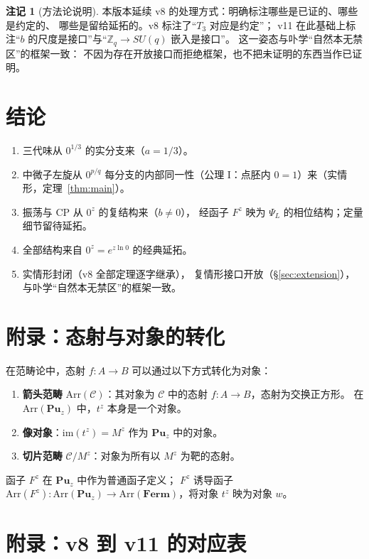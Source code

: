 \documentclass[11pt]{ctexart}
\theoremstyle{plain}
\theoremstyle{definition}
\newtheorem{rem}[thm]{注记}
\newcommand{\Cat}{\mathbf}
\begin{document}
\begin{rem}[方法论说明]\label{rem:method}
本版本延续 v8 的处理方式：明确标注哪些是已证的、哪些是约定的、
哪些是留给延拓的。v8 标注了“$T_3$ 对应是约定”；
v11 在此基础上标注“$b$ 的尺度是接口”与“$\mathbb{Z}_q\to SU(q)$
嵌入是接口”。
这一姿态与卟学“自然本无禁区”的框架一致：
不因为存在开放接口而拒绝框架，也不把未证明的东西当作已证明。
\end{rem}

\section{结论}

\begin{enumerate}
\item 三代味从 $0^{1/3}$ 的实分支来（$a = 1/3$）。
\item 中微子左旋从 $0^{p/q}$ 每分支的内部同一性（公理 I：点胚内
$0=1$）来（实情形，定理~\ref{thm:main}）。
\item 振荡与 CP 从 $0^z$ 的复结构来（$b\neq 0$），
经函子 $F^z$ 映为 $\Psi_L$ 的相位结构；定量细节留待延拓。
\item 全部结构来自 $0^z = e^{z\ln 0}$ 的经典延拓。
\item 实情形封闭（v8 全部定理逐字继承），
复情形接口开放（\S\ref{sec:extension}），
与卟学“自然本无禁区”的框架一致。
\end{enumerate}

\appendix
\section{附录：态射与对象的转化}

在范畴论中，态射 $f: A\to B$ 可以通过以下方式转化为对象：
\begin{enumerate}
\item \textbf{箭头范畴} $\mathrm{Arr}(\mathcal{C})$：其对象为
$\mathcal{C}$ 中的态射 $f: A\to B$，态射为交换正方形。
在 $\mathrm{Arr}(\Cat{Pu}_z)$ 中，$t^z$ 本身是一个对象。
\item \textbf{像对象}：$\mathrm{im}(t^z) = M^z$ 作为 $\Cat{Pu}_z$ 中的对象。
\item \textbf{切片范畴} $\mathcal{C}/M^z$：对象为所有以 $M^z$ 为靶的态射。
\end{enumerate}

函子 $F^z$ 在 $\Cat{Pu}_z$ 中作为普通函子定义；
$F^z$ 诱导函子 $\mathrm{Arr}(F^z): \mathrm{Arr}(\Cat{Pu}_z)
\to \mathrm{Arr}(\Cat{Ferm})$，将对象 $t^z$ 映为对象 $w$。

\section{附录：v8 到 v11 的对应表}
\end{document}
